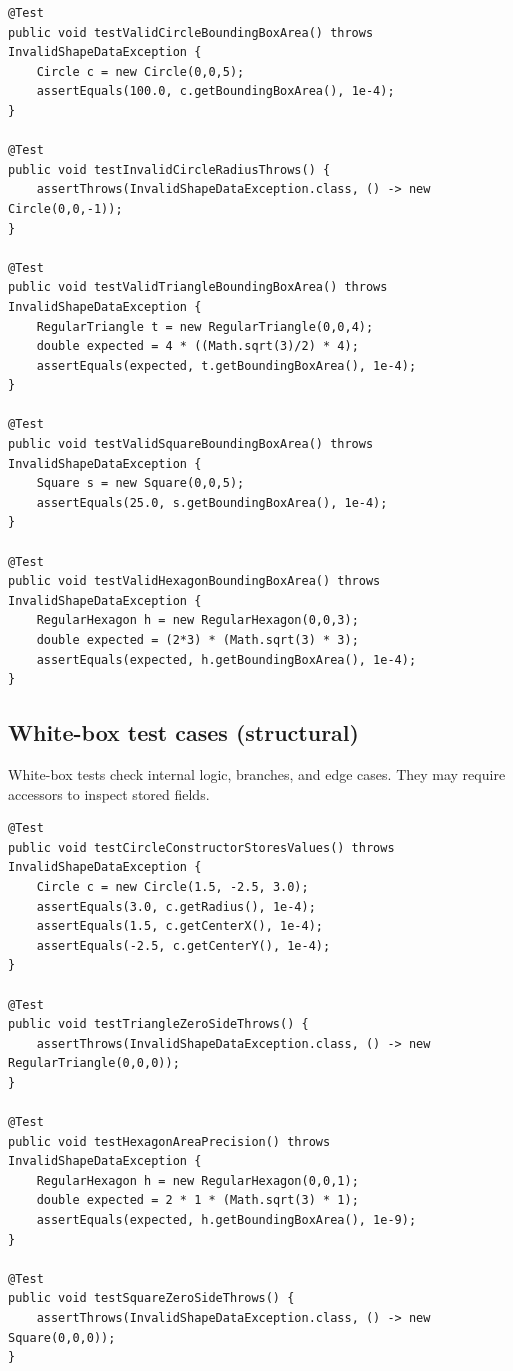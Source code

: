 \documentclass[a4paper,12pt]{article}
\begin{document}
\begin{lstlisting}[caption={Black-box tests (JUnit 4 snippets)}]
@Test
public void testValidCircleBoundingBoxArea() throws InvalidShapeDataException {
    Circle c = new Circle(0,0,5);
    assertEquals(100.0, c.getBoundingBoxArea(), 1e-4);
}

@Test
public void testInvalidCircleRadiusThrows() {
    assertThrows(InvalidShapeDataException.class, () -> new Circle(0,0,-1));
}

@Test
public void testValidTriangleBoundingBoxArea() throws InvalidShapeDataException {
    RegularTriangle t = new RegularTriangle(0,0,4);
    double expected = 4 * ((Math.sqrt(3)/2) * 4);
    assertEquals(expected, t.getBoundingBoxArea(), 1e-4);
}

@Test
public void testValidSquareBoundingBoxArea() throws InvalidShapeDataException {
    Square s = new Square(0,0,5);
    assertEquals(25.0, s.getBoundingBoxArea(), 1e-4);
}

@Test
public void testValidHexagonBoundingBoxArea() throws InvalidShapeDataException {
    RegularHexagon h = new RegularHexagon(0,0,3);
    double expected = (2*3) * (Math.sqrt(3) * 3);
    assertEquals(expected, h.getBoundingBoxArea(), 1e-4);
}
\end{lstlisting}

\newpage

\subsection{White-box test cases (structural)}
White-box tests check internal logic, branches, and edge cases. They may require accessors to inspect stored fields.

\begin{lstlisting}[caption={White-box tests (JUnit 4 snippets)}]
@Test
public void testCircleConstructorStoresValues() throws InvalidShapeDataException {
    Circle c = new Circle(1.5, -2.5, 3.0);
    assertEquals(3.0, c.getRadius(), 1e-4);
    assertEquals(1.5, c.getCenterX(), 1e-4);
    assertEquals(-2.5, c.getCenterY(), 1e-4);
}

@Test
public void testTriangleZeroSideThrows() {
    assertThrows(InvalidShapeDataException.class, () -> new RegularTriangle(0,0,0));
}

@Test
public void testHexagonAreaPrecision() throws InvalidShapeDataException {
    RegularHexagon h = new RegularHexagon(0,0,1);
    double expected = 2 * 1 * (Math.sqrt(3) * 1);
    assertEquals(expected, h.getBoundingBoxArea(), 1e-9);
}

@Test
public void testSquareZeroSideThrows() {
    assertThrows(InvalidShapeDataException.class, () -> new Square(0,0,0));
}
\end{lstlisting}
\end{document}
